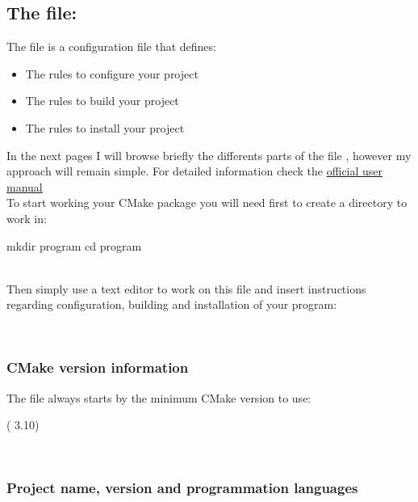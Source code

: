 \subsection{The file: } 

The file  is a configuration file that defines:  
\begin{itemize}
\item The rules to configure your project
\item The rules to build your project
\item The rules to install your project
\end{itemize}
In the next pages I will browse briefly the differents parts of the file , however my approach will remain simple. 
For detailed information check the \href{https://cmake.org/cmake/help/latest/index.html}{official user manual} \\[0.25cm]
To start working your CMake package you will need first to create a directory to work in:
\begin{script}
\fprompt{~} mkdir program
\fprompt{~} cd program
\end{script}
\\[-0.25cm]
\noindent Then simply use a text editor to work on this file and insert instructions regarding configuration, building and installation of your program:
\begin{script}
  
\end{script}
\\[-1.5cm]

\subsubsection*{CMake version information}

The file  always starts by the minimum CMake version to use: 
\begin{script}
 ( 3.10)
\end{script}
\\[-1.5cm]

\subsubsection*{Project name, version and programmation languages}
\label{cmake_pname}

